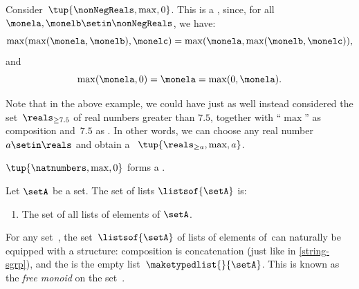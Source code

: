 %




\begin{example}
    Consider~$\tup{\nonNegReals,\max,0}$.
    This is a , since, for all~$\monela,\monelb\setin \nonNegReals$, we have:
    \begin{equation}
        \max(\max(\monela,\monelb),\monelc)=\max(\monela,\max(\monelb,\monelc)),
    \end{equation}
    and
    \begin{equation}
        \max(\monela,0)=\monela=\max(0,\monela).
    \end{equation}
\end{example}

\begin{remark}
    Note that in the above example, we could have just as well instead considered the set~$\reals_{\geq 7.5}$ of real numbers greater than $7.5$, together with ``$\max$'' as composition and~$7.5$ as .
    In other words, we can choose any real number $a \setin \reals$ and obtain a ~$\tup{\reals_{\geq a},\max, a}$.
\end{remark}

\begin{example}
    $\tup{\natnumbers, {{\max}},0}$ forms a .
\end{example}

\begin{definition}
    \label{def:set-of-lists}
    Let $\setA$ be a set.
    The set of lists $\listsof{\setA}$ is:

    \constit
    \begin{enumerate}
        \item The set of all lists of elements of $\setA$.
    \end{enumerate}
\end{definition}

\begin{example}
    \label{exa:string-monoid}
    For any set~\setA, the set~$\listsof{\setA}$ of lists of elements of~\setA can naturally be equipped with a  structure: composition is concatenation (just like in \cref{string-sgrp}), and the  is the empty list~$\maketypedlist{}{\setA}$.
    This  is known as the \emph{free monoid} on the set~\setA.
\end{example}


